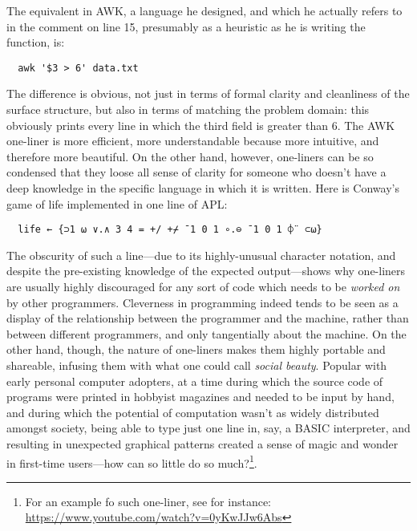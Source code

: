 The equivalent in AWK, a language he designed, and which he actually refers to in the comment on line 15, presumably as a heuristic as he is writing the function, is:

\begin{lstlisting}
  awk '$3 > 6' data.txt
\end{lstlisting}

The difference is obvious, not just in terms of formal clarity and cleanliness of the surface structure, but also in terms of matching the problem domain: this obviously prints every line in which the third field is greater than 6. The AWK one-liner is more efficient, more understandable because more intuitive, and therefore more beautiful. On the other hand, however, one-liners can be so condensed that they loose all sense of clarity for someone who doesn't have a deep knowledge in the specific language in which it is written. Here is Conway's game of life implemented in one line of APL:

\begin{verbatim}
  life ← {⊃1 ⍵ ∨.∧ 3 4 = +/ +⌿ ¯1 0 1 ∘.⊖ ¯1 0 1 ⌽¨ ⊂⍵}
\end{verbatim}

The obscurity of such a line—due to its highly-unusual character notation, and despite the pre-existing knowledge of the expected output—shows why one-liners are usually highly discouraged for any sort of code which needs to be \emph{worked on} by other programmers. Cleverness in programming indeed tends to be seen as a display of the relationship between the programmer and the machine, rather than between different programmers, and only tangentially about the machine. On the other hand, though, the nature of one-liners makes them highly portable and shareable, infusing them with what one could call \emph{social beauty}. Popular with early personal computer adopters, at a time during which the source code of programs were printed in hobbyist magazines and needed to be input by hand, and during which the potential of computation wasn't as widely distributed amongst society, being able to type just one line in, say, a BASIC interpreter, and resulting in unexpected graphical patterns created a sense of magic and wonder in first-time users—how can so little do so much?\footnote{For an example fo such one-liner, see for instance: \url{https://www.youtube.com/watch?v=0yKwJJw6Abs}}.

